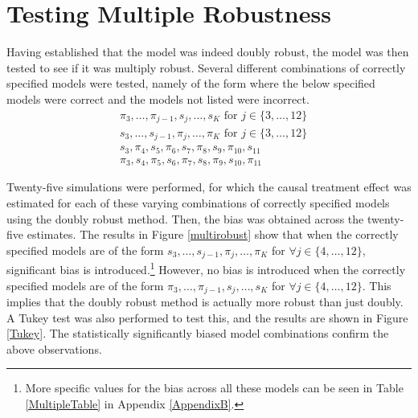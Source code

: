 \newpage
\section{Testing Multiple Robustness} \label{multiplerobust}
Having established that the model was indeed doubly robust, the model was then tested to see if it was multiply robust.  Several different combinations of correctly specified models were tested, namely of the form where the below specified models were correct and the models not listed were incorrect.  
\begin{align} 
& \pi_3, \dots, \pi_{j-1}, s_j, \dots, s_K \text{ for } j \in \{3, \dots, 12 \} \\
& s_3, \dots, s_{j-1}, \pi_j, \dots, \pi_K\text{ for } j \in \{3, \dots, 12 \}   \\
& s_3, \pi_4, s_5, \pi_6, s_7, \pi_8, s_9, \pi_{10}, s_{11}\\
& \pi_3, s_4, \pi_5, s_6, \pi_7, s_8, \pi_9, s_{10}, \pi_{11}
\end{align} 

Twenty-five simulations were performed, for which the causal treatment effect was estimated for each of these varying combinations of correctly specified models using the doubly robust method.   Then, the bias was obtained across the twenty-five estimates.  The results in Figure \ref{multirobust} show that when the correctly specified models are of the form $s_3, \dots, s_{j-1}, \pi_j, \dots, \pi_K$ for $\forall j \in \{4, \dots, 12 \} $, significant bias is introduced.\footnote{More specific values for the bias across all these models can be seen in Table \ref{MultipleTable} in Appendix \ref{AppendixB}.}  However, no bias is introduced when the correctly specified models are of the form $\pi_3, \dots, \pi_{j-1}, s_j, \dots, s_K $ for  $\forall j \in \{4, \dots, 12 \}$.  This implies that the doubly robust method is actually more robust than just doubly.  A Tukey test was also performed to test this, and the results are shown in Figure \ref{Tukey}.  The statistically significantly biased model combinations confirm the above observations.  

